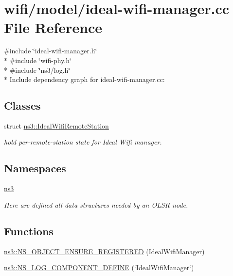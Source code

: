 \hypertarget{ideal-wifi-manager_8cc}{}\section{wifi/model/ideal-\/wifi-\/manager.cc File Reference}
\label{ideal-wifi-manager_8cc}
{\ttfamily \#include \char`\"{}ideal-\/wifi-\/manager.\+h\char`\"{}}\\*
{\ttfamily \#include \char`\"{}wifi-\/phy.\+h\char`\"{}}\\*
{\ttfamily \#include \char`\"{}ns3/log.\+h\char`\"{}}\\*
Include dependency graph for ideal-\/wifi-\/manager.cc\+:
\subsection*{Classes}
\begin{DoxyCompactItemize}
\item 
struct \hyperlink{structns3_1_1IdealWifiRemoteStation}{ns3\+::\+Ideal\+Wifi\+Remote\+Station}
\begin{DoxyCompactList}\small\item\em hold per-\/remote-\/station state for Ideal Wifi manager. \end{DoxyCompactList}\end{DoxyCompactItemize}
\subsection*{Namespaces}
\begin{DoxyCompactItemize}
\item 
 \hyperlink{namespacens3}{ns3}
\begin{DoxyCompactList}\small\item\em Here are defined all data structures needed by an O\+L\+SR node. \end{DoxyCompactList}\end{DoxyCompactItemize}
\subsection*{Functions}
\begin{DoxyCompactItemize}
\item 
\hyperlink{namespacens3_a19ebd98696dac9298aaf05373c8d2ac5}{ns3\+::\+N\+S\+\_\+\+O\+B\+J\+E\+C\+T\+\_\+\+E\+N\+S\+U\+R\+E\+\_\+\+R\+E\+G\+I\+S\+T\+E\+R\+ED} (Ideal\+Wifi\+Manager)
\item 
\hyperlink{namespacens3_a20b859399c2c96fb9ec382b0ea7051fa}{ns3\+::\+N\+S\+\_\+\+L\+O\+G\+\_\+\+C\+O\+M\+P\+O\+N\+E\+N\+T\+\_\+\+D\+E\+F\+I\+NE} (\char`\"{}Ideal\+Wifi\+Manager\char`\"{})
\end{DoxyCompactItemize}
